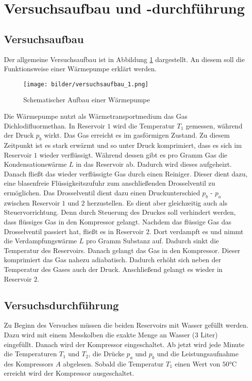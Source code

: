 \section{Versuchsaufbau und -durchführung}

\subsection{Versuchsaufbau}

Der allgemeine Versuchsaufbau ist in Abbildung \ref{fig:aufbau_warmepumpe} dargestellt.
An diesem soll die Funktionsweise einer Wärmepumpe erklärt werden.
\begin{figure}
\centering
\texttt{[image: bilder/versuchsaufbau\_1.png]}
\caption{Schematischer Aufbau einer Wärmepumpe}
\label{fig:aufbau_warmepumpe}
\end{figure}
Die Wärmepumpe nutzt als Wärmetransportmedium das Gas Dichlodifluormethan.
In Reservoir $1$ wird die Temperatur $T_1$ gemessen, während der Druck $p_b$ wirkt.
Das Gas erreicht es im gasförmigen Zustand. Zu diesem Zeitpunkt ist es
stark erwärmt und so unter Druck komprimiert, dass es sich im Reservoir $1$ wieder verflüssigt.
Während dessen gibt es pro Gramm Gas die Kondensationswärme $L$ in das Reservoir ab.
Dadurch wird dieses aufgeheizt.
Danach fließt das wieder verflüssigte Gas durch einen Reiniger.
Dieser dient dazu, eine blasenfreie Flüssigkeitszufuhr zum anschließenden
Drosselventil zu ermöglichen.
Das Drosselventil dient dazu einen Druckunterschied
$p_b$ - $p_a$ zwischen Reservoir $1$ und $2$ herzustellen.
Es dient aber gleichzeitig auch als Steuervorrichtung.
Denn durch Steuerung des Druckes soll verhindert werden,
dass flüssiges Gas in den Kompressor gelangt.
Nachdem das flüssige Gas das Drosselventil passiert hat,
fließt es in Reservoir $2$. Dort verdampft es und nimmt die Verdampfungswärme
$L$ pro Gramm Substanz auf. Dadurch sinkt die Temperatur des Reservoirs.
Danach gelangt das Gas in den Kompressor. Dieser komprimiert das Gas nahezu adiabatisch.
Dadurch erhöht sich neben der Temperatur des Gases auch der Druck.
Anschließend gelangt es wieder in Reservoir $2$.


\subsection{Versuchsdurchführung}
Zu Beginn des Versuches müssen die beiden Reservoirs mit Wasser gefüllt werden.
Dazu wird mit einem Messkolben die exakte Menge an Wasser ($3$ Liter) eingefüllt.
Danach wird der Kompressor eingeschaltet.
Ab jetzt wird jede Minute die Temperaturen $T_1$ und $T_2$, die Drücke $p_a$ und $p_b$
und die Leistungsaufnahme des Kompressors $A$ abgelesen.
Sobald die Temperatur $T_1$ einen Wert von $50\si{\degreeCelsius}$ erreicht
wird der Kompressor ausgeschaltet.
